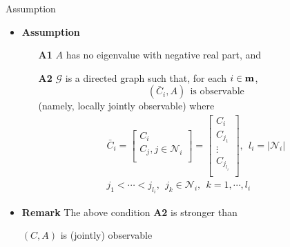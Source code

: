 \documentclass{beamer}
\begin{document}
\begin{frame}{\color{blue} Assumption}
\begin{itemize}
  \item \textbf{Assumption}
\begin{itemize}
  \item [\bf A1] $A$ has no eigenvalue with negative real part, and
  \item [\bf A2] $\mathcal{G}$ is a directed graph such that, for each $i\in{\bf m}$,
\begin{equation*}
(\bar{C}_{i},A)  ~~\text{is observable}
\end{equation*}
(namely, locally jointly observable) where
\begin{align*}
\bar{C}_{i}=\begin{bmatrix} C_{i} \\ C_{j},j\in\mathcal{N}_{i} \\ \end{bmatrix} =\begin{bmatrix} C_{i} \\ C_{j_{1}} \\ \vdots \\ C_{j_{l_{i}}} \\ \end{bmatrix},~~ l_{i}=|\mathcal{N}_{i}| \\
j_{1}<\cdots<j_{l_{i}},~~ j_{k}\in\mathcal{N}_{i},~~ k=1,\cdots, l_{i}
\end{align*}
\end{itemize}

  \item \textbf{Remark} The above condition {\bf A2} is stronger than
\begin{center}
{\color{red}$(C,A)$ is (jointly) observable}
\end{center}
\end{itemize} 


\end{frame}
\end{document}
